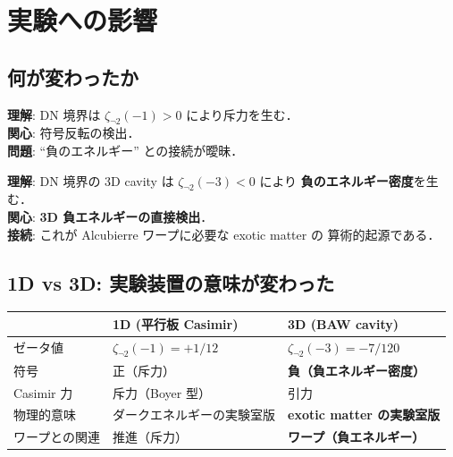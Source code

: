 \documentclass[11pt,a4paper]{article}
\begin{document}
\section{実験への影響}

\subsection{何が変わったか}

\begin{tcolorbox}[colback=gray!10,colframe=gray!50!black,title=前回 (v1)]
\textbf{理解}: DN 境界は $\zeta_{\neg 2}(-1) > 0$ により斥力を生む．\\
\textbf{関心}: 符号反転の検出．\\
\textbf{問題}: ``負のエネルギー'' との接続が曖昧．
\end{tcolorbox}

\begin{tcolorbox}[colback=green!5,colframe=green!60!black,title=現在 (v2)]
\textbf{理解}: DN 境界の 3D cavity は $\zeta_{\neg 2}(-3) < 0$ により
\textbf{負のエネルギー密度}を生む．\\
\textbf{関心}: \textbf{3D 負エネルギーの直接検出}．\\
\textbf{接続}: これが Alcubierre ワープに必要な exotic matter の
算術的起源である．
\end{tcolorbox}

\subsection{1D vs 3D: 実験装置の意味が変わった}

\begin{center}
\begin{tabular}{lll}
\toprule
& 1D (平行板 Casimir) & 3D (BAW cavity) \\
\midrule
ゼータ値 & $\zeta_{\neg 2}(-1) = +1/12$ & $\zeta_{\neg 2}(-3) = -7/120$ \\
符号 & 正（斥力） & \textbf{負（負エネルギー密度）} \\
Casimir 力 & 斥力（Boyer 型） & 引力 \\
物理的意味 & ダークエネルギーの実験室版 & \textbf{exotic matter の実験室版} \\
ワープとの関連 & 推進（斥力） & \textbf{ワープ（負エネルギー）} \\
\bottomrule
\end{tabular}
\end{center}
\end{document}
